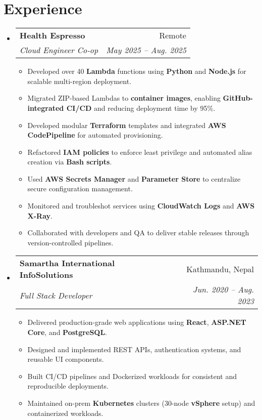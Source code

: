 \documentclass[letterpaper,11pt]{article}
\makeatletter
\newcommand{\resumeItem}[1]{\item\small{#1 \vspace{0pt}}}
\newcommand{\resumeSubheading}[4]{
  \vspace{-5pt}\item
    \begin{tabular*}{0.97\textwidth}[t]{l@{\extracolsep{\fill}}r}
      \textbf{#1} & #2 \\
      \textit{\small#3} & \textit{\small #4} \\
    \end{tabular*}\vspace{-7pt}
}
\makeatother
\begin{document}
\section*{Experience}
\begin{itemize}[leftmargin=*]

  \resumeSubheading{Health Espresso}{Remote}{Cloud Engineer Co-op}{May 2025 -- Aug. 2025}
  \begin{itemize}
    \resumeItem{Developed over 40 \textbf{Lambda} functions using \textbf{Python} and \textbf{Node.js} for scalable multi-region deployment.}
    \resumeItem{Migrated ZIP-based Lambdas to \textbf{container images}, enabling \textbf{GitHub-integrated CI/CD} and reducing deployment time by 95\%.}
    \resumeItem{Developed modular \textbf{Terraform} templates and integrated \textbf{AWS CodePipeline} for automated provisioning.}
    \resumeItem{Refactored \textbf{IAM policies} to enforce least privilege and automated alias creation via \textbf{Bash scripts}.}
    \resumeItem{Used \textbf{AWS Secrets Manager} and \textbf{Parameter Store} to centralize secure configuration management.}
    \resumeItem{Monitored and troubleshot services using \textbf{CloudWatch Logs} and \textbf{AWS X-Ray}.}
    \resumeItem{Collaborated with developers and QA to deliver stable releases through version-controlled pipelines.}
  \end{itemize}

  \resumeSubheading{Samartha International InfoSolutions}{Kathmandu, Nepal}{Full Stack Developer}{Jun. 2020 -- Aug. 2023}
  \begin{itemize}
    \resumeItem{Delivered production-grade web applications using \textbf{React}, \textbf{ASP.NET Core}, and \textbf{PostgreSQL}.}
    \resumeItem{Designed and implemented REST APIs, authentication systems, and reusable UI components.}
    \resumeItem{Built CI/CD pipelines and Dockerized workloads for consistent and reproducible deployments.}
    \resumeItem{Maintained on-prem \textbf{Kubernetes} clusters (30-node \textbf{vSphere} setup) and containerized workloads.}
  \end{itemize}

\end{itemize}

\end{document}
